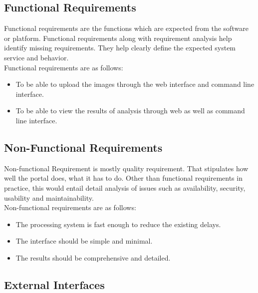 \subsection{Functional Requirements}
Functional requirements are the functions which are expected from the software or platform. Functional requirements along with requirement analysis help identify missing requirements. They help clearly define the expected system service and behavior.\\ Functional requirements are as follows:
\begin{itemize}
    \item To be able to upload the images through the web interface and command line interface.
    \item To be able to view the results of analysis through web as well as command line interface.
\end{itemize}

\subsection{Non-Functional Requirements}
Non-functional Requirement is mostly quality requirement. That stipulates how well the portal does, what it has to do. Other than functional requirements in practice, this would entail detail analysis of issues such as availability, security, usability and maintainability.\\
Non-functional requirements are as follows:
\begin{itemize}
    \item The processing system is fast enough to reduce the existing delays.
    \item The interface should be simple and minimal.
    \item The results should be comprehensive and detailed. 
\end{itemize} 

\subsection{External Interfaces}

